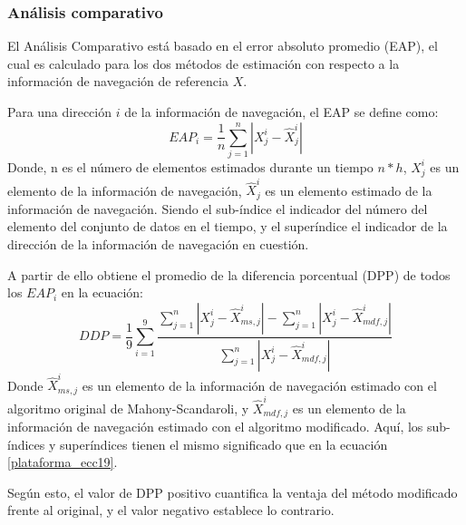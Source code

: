 \documentclass[10pt]{report}
\numberwithin{equation}{chapter}
\numberwithin{algorithm}{chapter}
\begin{document}
\subsubsection{Análisis comparativo} 
El Análisis Comparativo está basado en el error absoluto promedio (EAP), el cual es calculado para los dos métodos de estimación con respecto a la información de navegación de referencia $X$. \par
Para una dirección $i$ de la información de navegación, el EAP se define como:
\begin{equation}\label{plataforma_ecc19}
EAP_i=\frac{1}{n}\sum^n_{j=1}|X_j^i-\hat{X}^i_{j}|
\end{equation}
Donde, n es el número de elementos estimados durante un tiempo $n*h$, $X_j^i$ es un elemento de la información de navegación, $\hat{X}_{j}^i$ es un elemento estimado de la información de navegación. Siendo el sub-índice el indicador del número del elemento del conjunto de datos en el tiempo, y el superíndice el indicador de la dirección de la información de navegación en cuestión.\par
A partir de ello obtiene el promedio de la diferencia porcentual (DPP) de todos los $EAP_i$ en la ecuación:
\begin{equation}\label{plataforma_ecc1}
DDP=\frac{1}{9}\sum_{i=1}^9\frac{\sum_{j=1}^n|X_j^i-\hat{X}^i_{ms,j}|-\sum_{j=1}^n|X_j^i-\hat{X}_{mdf,j}^i|}{\sum_{j=1}^{n}|X^i_j-\hat{X}^i_{mdf,j}|}
\end{equation}
Donde $\hat{X}_{ms,j}^i$ es un elemento de la información de navegación estimado con el algoritmo original de Mahony-Scandaroli, y  $\hat{X}_{mdf,j}^i$ es un elemento de la información de navegación estimado con el algoritmo modificado. Aquí, los sub-índices y superíndices tienen el mismo significado que en la ecuación \eqref{plataforma_ecc19}.\par
Según esto, el valor de DPP positivo cuantifica la ventaja del método modificado frente al original, y el valor negativo establece lo contrario.
\end{document}
